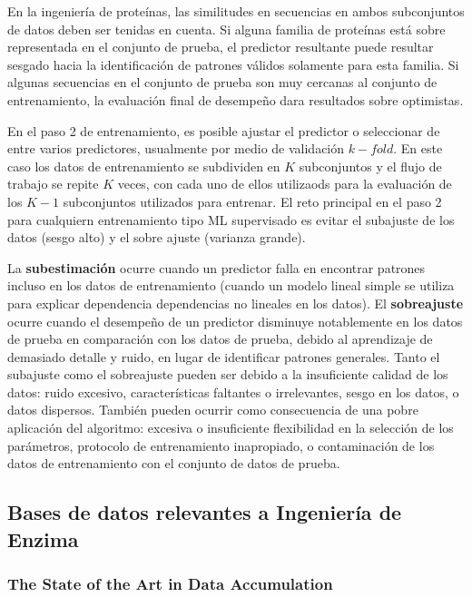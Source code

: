 \documentclass[12pt]{article}
\begin{document}
En la ingeniería de proteínas, las similitudes en secuencias en ambos subconjuntos de datos deben ser tenidas en cuenta. Si alguna familia de proteínas está sobre representada en el conjunto de prueba, el predictor resultante puede resultar sesgado hacia la identificación de patrones válidos solamente para esta familia. Si algunas secuencias en el conjunto de prueba son muy cercanas al conjunto de entrenamiento, la evaluación final de desempeño dara resultados sobre optimistas. 

En el paso 2 de entrenamiento, es posible ajustar el predictor o seleccionar de entre varios predictores, usualmente por medio de validación $k-fold$. En este caso los datos de entrenamiento se subdividen en $K$ subconjuntos y el flujo de trabajo se repite $K$ veces, con cada uno de ellos utilizaods para la evaluación de los $K-1$ subconjuntos utilizados para entrenar. El reto principal en el paso 2 para cualquiern entrenamiento tipo ML supervisado es evitar el subajuste de los datos (sesgo alto) y el sobre ajuste (varianza grande). 

La \textbf{subestimación} ocurre cuando un predictor falla en encontrar patrones incluso en los datos de entrenamiento (cuando un modelo lineal simple se utiliza para explicar dependencia dependencias no lineales en los datos). El \textbf{sobreajuste} ocurre cuando el desempeño de un predictor disminuye notablemente en los datos de prueba en comparación con los datos de prueba, debido al aprendizaje de demasiado detalle y ruido, en lugar de identificar patrones generales. Tanto el subajuste como el sobreajuste pueden ser debido a la insuficiente calidad de los datos: ruido excesivo, características faltantes o irrelevantes, sesgo en los datos, o datos dispersos. También pueden ocurrir como consecuencia de una pobre aplicación del algoritmo: excesiva o insuficiente flexibilidad en la selección de los parámetros, protocolo de entrenamiento inapropiado, o contaminación de los datos de entrenamiento con el conjunto de datos de prueba.


\subsection{Bases de datos relevantes a Ingeniería de Enzima}


\subsubsection{The State of the Art in Data Accumulation}
\end{document}
